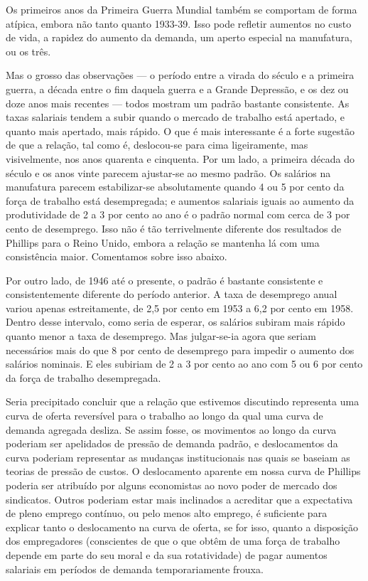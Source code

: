 \documentclass[12pt]{article}
\begin{document}
Os primeiros anos da Primeira Guerra Mundial também se comportam de forma atípica, embora não tanto quanto 1933-39. Isso pode refletir aumentos no custo de vida, a rapidez do aumento da demanda, um aperto especial na manufatura, ou os três.

Mas o grosso das observações — o período entre a virada do século e a primeira guerra, a década entre o fim daquela guerra e a Grande Depressão, e os dez ou doze anos mais recentes — todos mostram um padrão bastante consistente. As taxas salariais tendem a subir quando o mercado de trabalho está apertado, e quanto mais apertado, mais rápido. O que é mais interessante é a forte sugestão de que a relação, tal como é, deslocou-se para cima ligeiramente, mas visivelmente, nos anos quarenta e cinquenta. Por um lado, a primeira década do século e os anos vinte parecem ajustar-se ao mesmo padrão. Os salários na manufatura parecem estabilizar-se absolutamente quando 4 ou 5 por cento da força de trabalho está desempregada; e aumentos salariais iguais ao aumento da produtividade de 2 a 3 por cento ao ano é o padrão normal com cerca de 3 por cento de desemprego. Isso não é tão terrivelmente diferente dos resultados de Phillips para o Reino Unido, embora a relação se mantenha lá com uma consistência maior. Comentamos sobre isso abaixo.

Por outro lado, de 1946 até o presente, o padrão é bastante consistente e consistentemente diferente do período anterior. A taxa de desemprego anual variou apenas estreitamente, de 2,5 por cento em 1953 a 6,2 por cento em 1958. Dentro desse intervalo, como seria de esperar, os salários subiram mais rápido quanto menor a taxa de desemprego. Mas julgar-se-ia agora que seriam necessários mais do que 8 por cento de desemprego para impedir o aumento dos salários nominais. E eles subiriam de 2 a 3 por cento ao ano com 5 ou 6 por cento da força de trabalho desempregada.

Seria precipitado concluir que a relação que estivemos discutindo representa uma curva de oferta reversível para o trabalho ao longo da qual uma curva de demanda agregada desliza. Se assim fosse, os movimentos ao longo da curva poderiam ser apelidados de pressão de demanda padrão, e deslocamentos da curva poderiam representar as mudanças institucionais nas quais se baseiam as teorias de pressão de custos. O deslocamento aparente em nossa curva de Phillips poderia ser atribuído por alguns economistas ao novo poder de mercado dos sindicatos. Outros poderiam estar mais inclinados a acreditar que a expectativa de pleno emprego contínuo, ou pelo menos alto emprego, é suficiente para explicar tanto o deslocamento na curva de oferta, se for isso, quanto a disposição dos empregadores (conscientes de que o que obtêm de uma força de trabalho depende em parte do seu moral e da sua rotatividade) de pagar aumentos salariais em períodos de demanda temporariamente frouxa.
\end{document}
